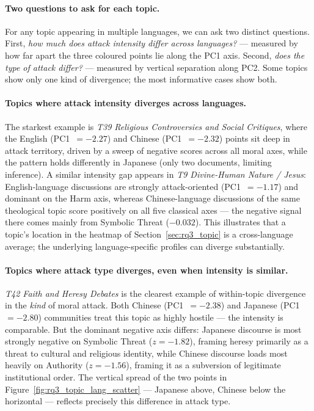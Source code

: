 \documentclass[../CLthesis.tex]{subfiles}
\begin{document}
\paragraph{Two questions to ask for each topic.}
For any topic appearing in multiple languages, we can ask two distinct questions. First, \emph{how much does attack intensity differ across languages?} — measured by how far apart the three coloured points lie along the PC1 axis. Second, \emph{does the type of attack differ?} — measured by vertical separation along PC2. Some topics show only one kind of divergence; the most informative cases show both.

\paragraph{Topics where attack intensity diverges across languages.}
The starkest example is \textit{T39 Religious Controversies and Social Critiques}, where the English (PC1~$= -2.27$) and Chinese (PC1~$= -2.32$) points sit deep in attack territory, driven by a sweep of negative scores across all moral axes, while the pattern holds differently in Japanese (only two documents, limiting inference). A similar intensity gap appears in \textit{T9 Divine-Human Nature / Jesus}: English-language discussions are strongly attack-oriented (PC1~$= -1.17$) and dominant on the Harm axis, whereas Chinese-language discussions of the same theological topic score positively on all five classical axes — the negative signal there comes mainly from Symbolic Threat (${-0.032}$). This illustrates that a topic's location in the heatmap of Section~\ref{sec:rq3_topic} is a cross-language average; the underlying language-specific profiles can diverge substantially.

\paragraph{Topics where attack type diverges, even when intensity is similar.}
\textit{T42 Faith and Heresy Debates} is the clearest example of within-topic divergence in the \emph{kind} of moral attack. Both Chinese (PC1~$= -2.38$) and Japanese (PC1~$= -2.80$) communities treat this topic as highly hostile — the intensity is comparable. But the dominant negative axis differs: Japanese discourse is most strongly negative on Symbolic Threat ($z = -1.82$), framing heresy primarily as a threat to cultural and religious identity, while Chinese discourse loads most heavily on Authority ($z = -1.56$), framing it as a subversion of legitimate institutional order. The vertical spread of the two points in Figure~\ref{fig:rq3_topic_lang_scatter} — Japanese above, Chinese below the horizontal — reflects precisely this difference in attack type.
\end{document}
